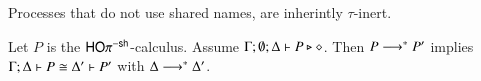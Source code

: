 \smallskip 

\noi Processes that do not use shared names, are inherintly $\tau$-inert.

\smallskip 

\begin{lemma}\rm
	\label{lem:tau_inert}
	Let $P$ is the $\mathsf{HO}\pi^{-\mathsf{sh}}$-calculus. 
Assume $\Gamma; \emptyset; \Delta \vdash P \triangleright \diamond$. Then 
$P \longrightarrow^\ast P'$ implies $\Gamma; \Delta \vdash 
P \cong \Delta'\vdash P'$ with $\Delta \longrightarrow^\ast \Delta'$. 
\end{lemma}



